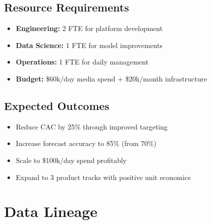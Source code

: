 \documentclass[11pt,a4paper]{report}
\begin{document}
\section{Resource Requirements}
\begin{itemize}
    \item \textbf{Engineering:} 2 FTE for platform development
    \item \textbf{Data Science:} 1 FTE for model improvements
    \item \textbf{Operations:} 1 FTE for daily management
    \item \textbf{Budget:} \$60k/day media spend + \$20k/month infrastructure
\end{itemize}

\section{Expected Outcomes}
\begin{itemize}
    \item Reduce CAC by 25\% through improved targeting
    \item Increase forecast accuracy to 85\% (from 70\%)
    \item Scale to \$100k/day spend profitably
    \item Expand to 3 product tracks with positive unit economics
\end{itemize}

\appendix
\chapter{Data Lineage}
\end{document}
